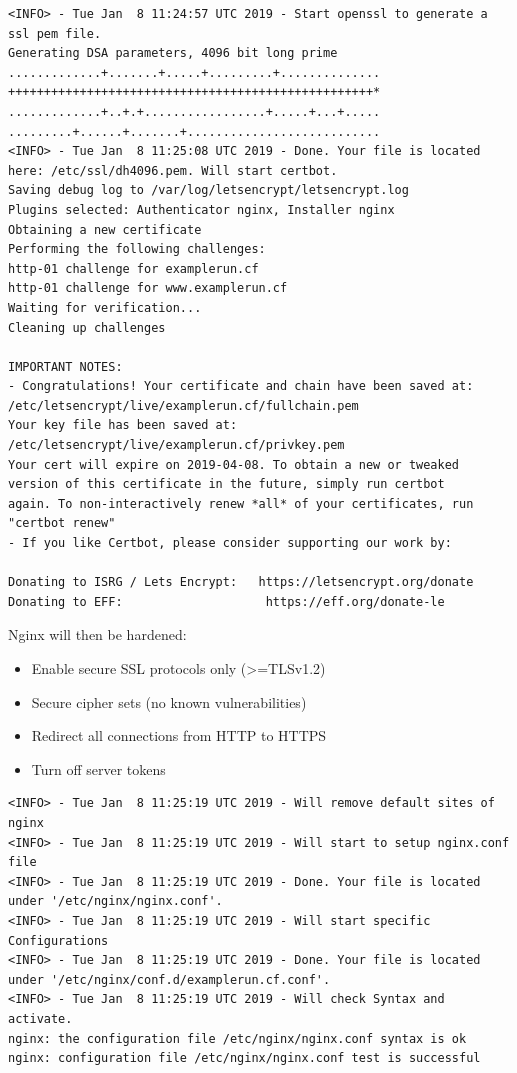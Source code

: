 \begin{lstlisting}
<INFO> - Tue Jan  8 11:24:57 UTC 2019 - Start openssl to generate a ssl pem file.
Generating DSA parameters, 4096 bit long prime
.............+.......+.....+.........+..............
+++++++++++++++++++++++++++++++++++++++++++++++++++*
.............+..+.+.................+.....+...+.....
.........+......+.......+...........................
<INFO> - Tue Jan  8 11:25:08 UTC 2019 - Done. Your file is located here: /etc/ssl/dh4096.pem. Will start certbot.
Saving debug log to /var/log/letsencrypt/letsencrypt.log
Plugins selected: Authenticator nginx, Installer nginx
Obtaining a new certificate
Performing the following challenges:
http-01 challenge for examplerun.cf
http-01 challenge for www.examplerun.cf
Waiting for verification...
Cleaning up challenges

IMPORTANT NOTES:
- Congratulations! Your certificate and chain have been saved at:
/etc/letsencrypt/live/examplerun.cf/fullchain.pem
Your key file has been saved at:
/etc/letsencrypt/live/examplerun.cf/privkey.pem
Your cert will expire on 2019-04-08. To obtain a new or tweaked
version of this certificate in the future, simply run certbot
again. To non-interactively renew *all* of your certificates, run
"certbot renew"
- If you like Certbot, please consider supporting our work by:

Donating to ISRG / Lets Encrypt:   https://letsencrypt.org/donate
Donating to EFF:                    https://eff.org/donate-le
\end{lstlisting}

Nginx will then be hardened:
\begin{itemize}
    \item{Enable secure SSL protocols only (>=TLSv1.2)}
    \item{Secure cipher sets (no known vulnerabilities)}
    \item{Redirect all connections from HTTP to HTTPS}
    \item{Turn off server tokens}
\end{itemize}

\begin{lstlisting}
<INFO> - Tue Jan  8 11:25:19 UTC 2019 - Will remove default sites of nginx
<INFO> - Tue Jan  8 11:25:19 UTC 2019 - Will start to setup nginx.conf file
<INFO> - Tue Jan  8 11:25:19 UTC 2019 - Done. Your file is located under '/etc/nginx/nginx.conf'.
<INFO> - Tue Jan  8 11:25:19 UTC 2019 - Will start specific Configurations
<INFO> - Tue Jan  8 11:25:19 UTC 2019 - Done. Your file is located under '/etc/nginx/conf.d/examplerun.cf.conf'.
<INFO> - Tue Jan  8 11:25:19 UTC 2019 - Will check Syntax and activate.
nginx: the configuration file /etc/nginx/nginx.conf syntax is ok
nginx: configuration file /etc/nginx/nginx.conf test is successful
\end{lstlisting}

